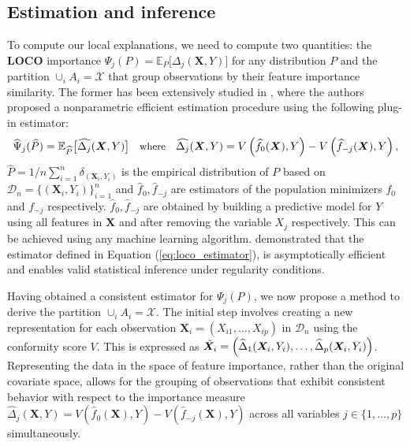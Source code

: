 \documentclass{article}
\newcommand\X{\boldsymbol{X}}
\theoremstyle{plain}
\theoremstyle{definition}
\theoremstyle{remark}
\newcommand{\loco}{\textcolor{loco}{\textbf{LOCO}}}
\begin{document}
\subsection{Estimation and inference}
To compute our local explanations, we need to compute two quantities: the \loco{} importance $\Psi_{j}(P) = \mathbb{E}_P\big[ \Delta_{j}(\X, Y)\big]$ for any distribution $P$ and the partition  $\cup_i A_i = \mathcal{X}$ that group observations by their feature importance similarity. The former has been extensively studied in \citep{williamson2021general}, where the authors proposed a nonparametric efficient estimation procedure using the following plug-in estimator:
\begin{align} 
    \small \widehat{\Psi}_{j}(\widehat{P}) = \mathbb{E}_{\widehat{P}}\big[ \widehat{\Delta_j}(\X, Y)\big] \quad \text{where} \quad \widehat{\Delta_j}(\X, Y) = V\left(\widehat{f}_0(\X), Y\right) - V\left(\widehat{f}_{-j}(\X), Y\right),
    \label{eq:loco_estimator}
\end{align}
 $\widehat{P} = 1/n\sum_{i=1}^{n} \delta_{(\X_i, Y_i)}$ is the empirical distribution of $P$ based on $\mathcal{D}_n = \{(\X_i, Y_i)\}_{i=1}^n$ and $\widehat{f}_0, \widehat{f}_{-j}$ are estimators of the population minimizers $f_0$ and $f_{-j}$ respectively. $\widehat{f}_0, \widehat{f}_{-j}$ are obtained by building a predictive model for $Y$ using all features in $\X$ and after removing the variable $X_j$ respectively. This can be achieved using any machine learning algorithm. \cite{williamson2021general} demonstrated that the estimator defined in Equation (\ref{eq:loco_estimator}), is asymptotically efficient and enables valid statistical inference under regularity conditions.

Having obtained a consistent estimator for $\Psi_{j}(P)$, we now propose a method to derive the partition $ \cup_i A_i = \mathcal{X}$. The initial step involves creating a new representation for each observation $\X_i = (X_{i1}, \dots, X_{ip})$ in $\mathcal{D}_n$ using the conformity score $V$. This is expressed as $\Tilde{\X}_i = \left(\widehat{\Delta}_{1}(\X_i, Y_i), \dots, \widehat{\Delta}_{p}(\X_i, Y_i)\right)$. Representing the data in the space of feature importance, rather than the original covariate space, allows for the grouping of observations that exhibit consistent behavior  with respect to the importance measure $\widehat{\Delta}_{j}(\X, Y) = V(\widehat{f}_0(\X), Y) - V(\widehat{f}_{-j}(\X), Y)$ across all variables $j \in \{1, \dots, p\}$ simultaneously.
\end{document}
